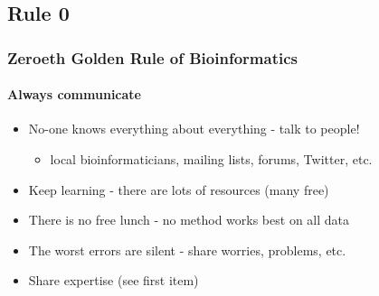 %

\subsection{Rule 0}
\begin{frame}
  \frametitle{Zeroeth Golden Rule of Bioinformatics}
  \framesubtitle{Always communicate}
  \begin{itemize}
    \item No-one knows everything about everything - talk to people!
    \begin{itemize}
      \item local bioinformaticians, mailing lists, forums, Twitter, etc.
    \end{itemize}
    \item Keep learning - there are lots of resources (many free)
    \item There is no free lunch - no method works best on all data
    \item The worst errors are silent - share worries, problems, etc.
    \item Share expertise (see first item)
  \end{itemize}
\end{frame}

